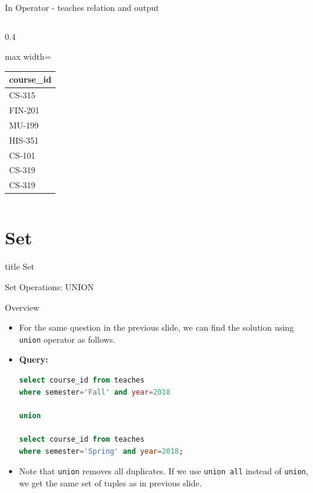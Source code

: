 \documentclass[aspectratio=169, xcolor=dvipsnames]{beamer}
\begin{document}
\begin{frame}{In Operator - teaches relation and output}
\begin{columns}
\begin{column}{0.4\textwidth}
\begin{center}
\begin{adjustbox}{max width=\textwidth}
                \begin{tabular}{|l|}
                \hline
                \textbf{course\_id} \\ \hline
                CS-315 \\ \hline
                FIN-201 \\ \hline
                MU-199 \\ \hline
                HIS-351 \\ \hline
                CS-101 \\ \hline
                CS-319 \\ \hline
                CS-319 \\ \hline
                \end{tabular}
                \end{adjustbox}
            \end{center}
        \end{column}
    \end{columns}
\end{frame}

\section{Set}
\begin{frame}
  \vfill
  \centering
  \begin{beamercolorbox}[sep=8pt,center,shadow=true,rounded=true]{title}
    Set\par%
  \end{beamercolorbox}
  \vfill
\end{frame}

\begin{frame}[fragile]{Set Operations: UNION}
    \begin{block}{Overview}
        \begin{itemize}[<+->]
            \item For the same question in the previous slide, we can find the solution using \texttt{union} operator as follows.
            \item \textbf{Query:}
            \begin{lstlisting}[language=SQL]
select course_id from teaches 
where semester='Fall' and year=2018 

union 

select course_id from teaches 
where semester='Spring' and year=2018;
            \end{lstlisting}
            \item Note that \texttt{union} removes all duplicates. If we use \texttt{union all} instead of \texttt{union}, we get the same set of tuples as in previous slide.
        \end{itemize}
    \end{block}
\end{frame}
\end{document}
